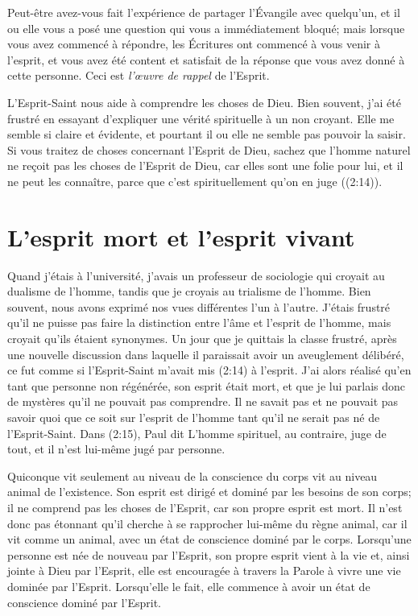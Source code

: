 Peut-être avez-vous fait l'expérience de partager l'Évangile avec quelqu'un,
 et il ou elle vous a posé une question qui vous a immédiatement bloqué;
 mais lorsque vous avez commencé à répondre, les Écritures ont commencé
 à vous venir à l'esprit, et vous avez été content et satisfait de la réponse
 que vous avez donné à cette personne. Ceci est \emph{l'œuvre de rappel}
 de l'Esprit.

L'Esprit-Saint nous aide à comprendre les choses de Dieu.
 Bien souvent, j'ai été frustré en essayant d'expliquer
 une vérité spirituelle à un non croyant.
 Elle me semble si claire et évidente, et pourtant il ou elle ne semble pas
 pouvoir la saisir.
 Si vous traitez de choses concernant l'Esprit de Dieu,
 sachez que l'homme naturel \Og ne reçoit pas les choses de l'Esprit de Dieu,
 car elles sont une folie pour lui, et il ne peut les connaître,
 parce que c'est spirituellement qu'on en juge \Fg{}
 ((2:14)).


\section{L'esprit mort et l'esprit vivant}

Quand j'étais à l'université, j'avais un professeur de sociologie
 qui croyait au dualisme de l'homme, tandis que je croyais au trialisme de l'homme.
 Bien souvent, nous avons exprimé nos vues différentes l'un à l'autre.
 J'étais frustré qu'il ne puisse pas faire la distinction entre l'âme
 et l'esprit de l'homme, mais croyait qu'ils étaient synonymes.
 Un jour que je quittais la classe frustré,
 après une nouvelle discussion dans laquelle il paraissait
 avoir un aveuglement délibéré, ce fut comme si l'Esprit-Saint
 m'avait mis (2:14) à l'esprit.
 J'ai alors réalisé qu'en tant que
 personne non régénérée, son esprit était mort,
 et que je lui parlais donc de mystères qu'il ne
 pouvait pas comprendre.
 Il ne savait pas et ne
 pouvait pas savoir quoi que ce soit sur l'esprit
 de l'homme tant qu'il ne serait pas né de l'Esprit-Saint.
 Dans (2:15), Paul dit\frcolon{}
 \Og L'homme spirituel, au contraire, juge de tout,
 et il n'est lui-même jugé par personne. \Fg{}

Quiconque vit seulement au niveau de la conscience du corps
 vit au niveau animal de l'existence.
 Son esprit est dirigé et dominé par les besoins de son corps;
 il ne comprend pas les choses de l'Esprit, car son propre esprit est mort.
 Il n'est donc pas étonnant qu'il cherche à se rapprocher lui-même
 du règne animal, car il vit comme un animal,
 avec un état de conscience dominé par le corps.
 Lorsqu'une personne est née de nouveau par l'Esprit,
 son propre esprit vient à la vie et, ainsi jointe à Dieu par l'Esprit,
 elle est encouragée à travers la Parole à vivre une vie dominée par l'Esprit.
 Lorsqu'elle le fait, elle commence à avoir un état de conscience dominé par l'Esprit.


